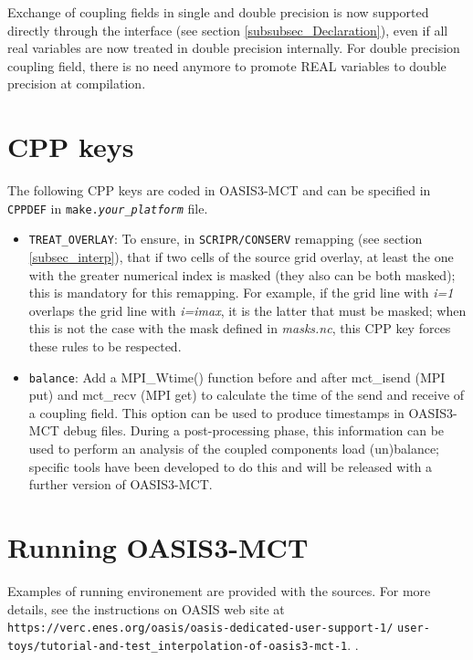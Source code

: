 Exchange of coupling fields in single and double precision is now supported directly through the interface 
(see section \ref{subsubsec_Declaration}), even if all real variables are now treated in double precision internally.
For double precision coupling field, there is no need anymore to promote REAL variables to double precision at compilation.

\section{CPP keys}
\label{subsec_cpp}

The following CPP keys are coded in OASIS3-MCT and can be specified in
{\tt CPPDEF} in {\tt make.{\it your\_platform}} file.

\begin{itemize}

\item {\tt TREAT\_OVERLAY}: To ensure, in {\tt SCRIPR/CONSERV}
  remapping (see section \ref{subsec_interp}), that if two cells of
  the source grid overlay, at least the one with the greater numerical
  index is masked (they also can be both masked); this is mandatory
  for this remapping. For example, if the grid line with {\it i=1} overlaps
  the grid line with {\it i=imax}, it is the latter that must be masked;
  when this is not the case with the mask defined in {\it masks.nc},
  this CPP key forces these rules to be respected.

\item {\tt balance}: Add a MPI\_Wtime() function before and after
  mct\_isend (MPI put) and mct\_recv (MPI get) to calculate the time
  of the send and receive of a coupling field. This option can be used
  to produce timestamps in OASIS3-MCT debug files. During a post-processing
  phase, this information can be used to perform an analysis of the
  coupled components load (un)balance; specific tools have been
  developed to do this and will be released with a further version of
  OASIS3-MCT.

\end{itemize}

\section{Running OASIS3-MCT}
\label{subsec_running}

Examples of running environement are provided with the sources. For
more details, see the instructions on OASIS web site at
{\tt https://verc.enes.org/oasis/oasis-dedicated-user-support-1/} {\tt user-toys/tutorial-and-test\_interpolation-of-oasis3-mct-1}.
.


